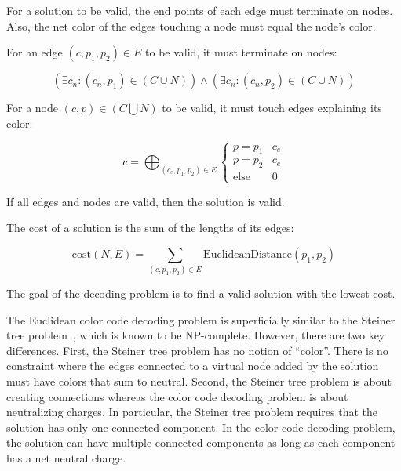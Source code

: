 \documentclass[onecolumn,unpublished,a4paper]{quantumarticle}
\theoremstyle{definition}
\theoremstyle{definition}
\theoremstyle{definition}
\begin{document}
For a solution to be valid, the end points of each edge must terminate on nodes.
Also, the net color of the edges touching a node must equal the node's color.

For an edge $(c, p_1, p_2) \in E$ to be valid, it must terminate on nodes:

$$\left(\exists c_n : (c_n, p_1) \in (C \cup N)\right) \land \left(\exists c_n : (c_n, p_2) \in (C \cup N)\right)$$

For a node $(c, p) \in (C \bigcup N)$ to be valid, it must touch edges explaining its color:

$$c = \bigoplus_{(c_e, p_1, p_2) \in E} \begin{cases}
p = p_1 & c_e\\
p=p_2 & c_e\\
\text{else} & 0\end{cases}$$

If all edges and nodes are valid, then the solution is valid.

The cost of a solution is the sum of the lengths of its edges:

$$\text{cost}(N, E) = \sum_{(c, p_1, p_2) \in E} \text{EuclideanDistance}(p_1, p_2)$$

The goal of the decoding problem is to find a valid solution with the lowest cost.

The Euclidean color code decoding problem is superficially similar to the Steiner tree problem~\cite{wikipedia_steiner_tree}, which is known to be NP-complete.
However, there are two key differences.
First, the Steiner tree problem has no notion of ``color''.
There is no constraint where the edges connected to a virtual node added by the solution must have colors that sum to neutral.
Second, the Steiner tree problem is about creating connections whereas the color code decoding problem is about neutralizing charges.
In particular, the Steiner tree problem requires that the solution has only one connected component.
In the color code decoding problem, the solution can have multiple connected components as long as each component has a net neutral charge.
\end{document}
